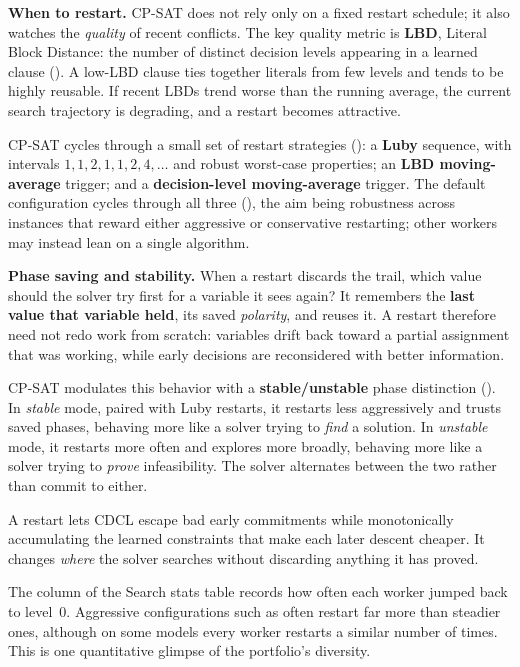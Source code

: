 \textbf{When to restart.} CP-SAT does not rely only on a fixed restart schedule;
it also watches the \emph{quality} of recent conflicts. The key quality metric is
\textbf{LBD}, Literal Block Distance: the number of distinct decision levels
appearing in a learned clause ().
A low-LBD clause ties together literals from few levels and tends to be highly
reusable. If recent LBDs trend worse than the running average, the current
search trajectory is degrading, and a restart becomes attractive.

CP-SAT cycles through a small set of restart strategies
(): a \textbf{Luby}
sequence, with intervals $1, 1, 2, 1, 1, 2, 4, \ldots$ and robust worst-case
properties; an \textbf{LBD moving-average} trigger; and a
\textbf{decision-level moving-average} trigger. The default configuration cycles
through all three (), the aim being robustness
across instances that reward either aggressive or conservative restarting; other
workers may instead lean on a single algorithm.

\textbf{Phase saving and stability.} When a restart discards the trail, which
value should the solver try first for a variable it sees again? It remembers the
\textbf{last value that variable held}, its saved \emph{polarity}, and reuses it.
A restart therefore need not redo work from scratch: variables drift back toward
a partial assignment that was working, while early decisions are reconsidered
with better information.

CP-SAT modulates this behavior with a \textbf{stable/unstable} phase distinction
(). In \emph{stable} mode, paired with Luby restarts, it
restarts less aggressively and trusts saved phases, behaving more like a solver
trying to \emph{find} a solution. In \emph{unstable} mode, it restarts more often
and explores more broadly, behaving more like a solver trying to \emph{prove}
infeasibility. The solver alternates between the two rather than commit to either.

A restart lets CDCL escape bad early commitments while monotonically accumulating
the learned constraints that make each later descent cheaper. It changes
\emph{where} the solver searches without discarding anything it has proved.

\begin{platypuslog}[htb]
The  column of the \textsf{Search stats} table records how often
each worker jumped back to level~0. Aggressive configurations such as
 often restart far more than steadier ones, although on some
models every worker restarts a similar number of times. This is one quantitative
glimpse of the portfolio's diversity.
\end{platypuslog}

